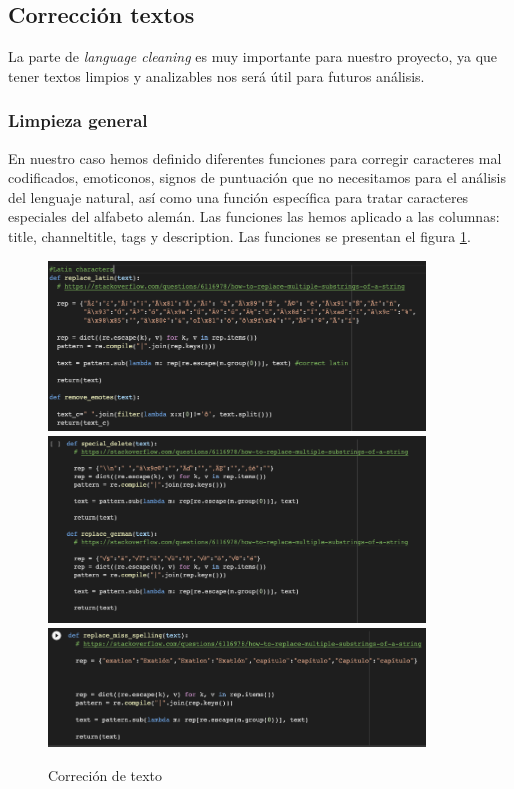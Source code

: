 \documentclass[a4paper,12pt]{article}
\begin{document}
\subsection{Correcci\'on  textos}
La parte de {\itshape language cleaning} es muy importante para nuestro proyecto, ya que tener textos limpios y analizables nos ser\'a \'util para futuros   an\'alisis.


\subsubsection{Limpieza general}

En nuestro caso hemos definido diferentes funciones para corregir caracteres mal codificados, emoticonos, signos de puntuaci\'on que no necesitamos para el an\'alisis del lenguaje natural, as\'i como una funci\'on espec\'ifica para tratar caracteres especiales del alfabeto alem\'an. Las funciones las hemos aplicado a las columnas: title, channel{\textunderscore}title,  tags y description. Las funciones se presentan el figura \ref{fig:corrtext}.



\begin{figure}[h!]
\centering
\includegraphics[width=10cm]{latin_characters.png}\\
\includegraphics[width=10cm]{german_characters.png}\\
\includegraphics[width=10cm]{misspellings.png}
\caption{Correci\'on de texto}
\label{fig:corrtext}
\end{figure}
\end{document}
